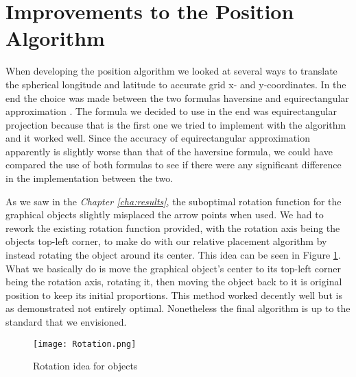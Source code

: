 \section{Improvements to the Position Algorithm}
\label{sec:posimp}

When developing the position algorithm we looked at several ways to translate the spherical longitude and latitude to accurate grid x- and y-coordinates. In the end the choice was made between the two formulas haversine and equirectangular approximation \cite{haversine,equi}. The formula we decided to use in the end was equirectangular projection because that is the first one we tried to implement with the algorithm and it worked well. Since the accuracy of equirectangular approximation apparently is slightly worse than that of the haversine formula, we could have compared the use of both formulas to see if there were any significant difference in the implementation between the two. 

As we saw in the \textit{Chapter \ref{cha:results}}, the suboptimal rotation function for the graphical objects slightly misplaced the arrow points when used. We had to rework the existing rotation function provided, with the rotation axis being the objects top-left corner, to make do with our relative placement algorithm by instead rotating the object around its center. This idea can be seen in Figure \ref{fig:rotation}. What we basically do is move the graphical object's center to its top-left corner being the rotation axis, rotating it, then moving the object back to it is original position to keep its initial proportions. This method worked decently well but is as demonstrated not entirely optimal. Nonetheless the final algorithm is up to the standard that we envisioned. 

\begin{figure}[ht!]
\begin{center}
	\texttt{[image: Rotation.png]}
	\caption{Rotation idea for objects}
	\label{fig:rotation}
\end{center}
\end{figure}

\newpage

